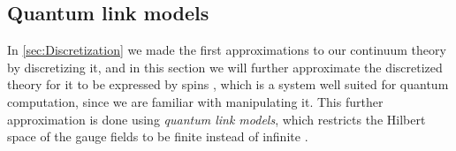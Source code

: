 \documentclass[../main.tex]{subfiles} %
\begin{document}
\subsection{Quantum link models} \label{sec:QuantumLinkModels}

In \cref{sec:Discretization} we made the first approximations to our continuum theory by discretizing it, and in this section we will further approximate the discretized theory for it to be expressed by spins \cite{Hauke_QLM_2013}, which is a system well suited for quantum computation, since we are familiar with manipulating it. This further approximation is done using \emph{quantum link models}, which restricts the Hilbert space of the gauge fields to be finite instead of infinite \cite{Barros_GaugeTheoriesWithUltracoldAtoms_2020}. %
\end{document}
